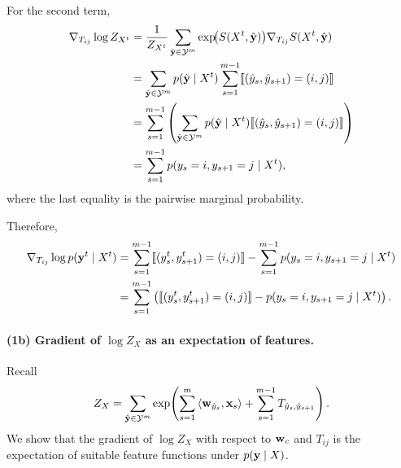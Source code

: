\documentclass[11pt]{report}
\begin{document}
For the second term,
\begin{align}
{\nabla}_{T_{ij}}\log Z_{X^t}
&=
\frac{1}{Z_{X^t}}
\sum_{\hat{\mathbf{\boldsymbol{y}}}\in\mathcal{Y}^m}
\exp\!\bigl(S(X^t,\hat{\mathbf{\boldsymbol{y}}})\bigr)
{\nabla}_{T_{ij}} S(X^t,\hat{\mathbf{\boldsymbol{y}}}) \\
&=
\sum_{\hat{\mathbf{\boldsymbol{y}}}\in\mathcal{Y}^m}
p(\hat{\mathbf{\boldsymbol{y}}}\mid X^t)
\sum_{s=1}^{m-1}
\llbracket (\hat y_s,\hat y_{s+1}) = (i,j) \rrbracket \\
&=
\sum_{s=1}^{m-1}
\left(
\sum_{\hat{\mathbf{\boldsymbol{y}}}\in\mathcal{Y}^m}
p(\hat{\mathbf{\boldsymbol{y}}}\mid X^t)
\llbracket (\hat y_s,\hat y_{s+1}) = (i,j) \rrbracket
\right) \\
&=
\sum_{s=1}^{m-1}
p(y_s=i,y_{s+1}=j \mid X^t),
\end{align}
where the last equality is the pairwise marginal probability.

Therefore,
\begin{align}
{\nabla}_{T_{ij}}\log p(\mathbf{\boldsymbol{y}}^t \mid X^t)
&=
\sum_{s=1}^{m-1}
\llbracket (y_s^t,y_{s+1}^t) = (i,j) \rrbracket
-
\sum_{s=1}^{m-1}
p(y_s=i,y_{s+1}=j \mid X^t) \\
&=
\sum_{s=1}^{m-1}
\left(
\llbracket (y_s^t,y_{s+1}^t) = (i,j) \rrbracket
-
p(y_s=i,y_{s+1}=j \mid X^t)
\right).
\end{align}

\paragraph{(1b) Gradient of $\log Z_X$ as an expectation of features.}
Recall
\begin{align}
Z_X
=
\sum_{\hat{\mathbf{\boldsymbol{y}}}\in\mathcal{Y}^m}
\exp\!\left(
\sum_{s=1}^m \left\langle \mathbf{\boldsymbol{w}}_{\hat y_s},\mathbf{\boldsymbol{x}}_s \right\rangle
+
\sum_{s=1}^{m-1} T_{\hat y_s,\hat y_{s+1}}
\right).
\end{align}
We show that the gradient of $\log Z_X$ with respect to $\mathbf{\boldsymbol{w}}_c$ and $T_{ij}$ is the expectation of suitable feature functions under $p(\mathbf{\boldsymbol{y}}\mid X)$.
\end{document}
